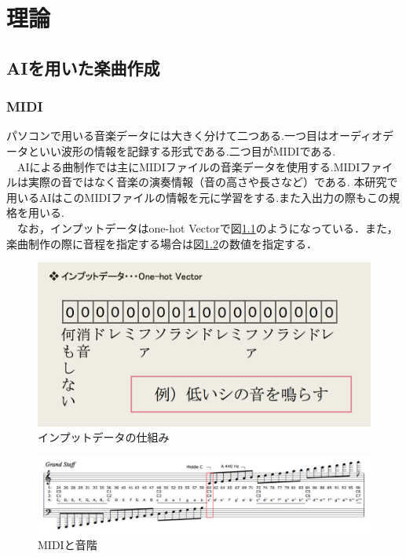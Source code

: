 \chapter{理論}
\section{AIを用いた楽曲作成}
\subsection{MIDI}
パソコンで用いる音楽データには大きく分けて二つある.一つ目はオーディオデータといい波形の情報を記録する形式である.二つ目がMIDIである.\\
　AIによる曲制作では主にMIDIファイルの音楽データを使用する.MIDIファイルは実際の音ではなく音楽の演奏情報（音の高さや長さなど）である.
本研究で用いるAIはこのMIDIファイルの情報を元に学習をする.また入出力の際もこの規格を用いる.\\
　なお，インプットデータはone-hot Vectorで図\ref{fig:インプットデータの仕組み}のようになっている．また，楽曲制作の際に音程を指定する場合は図\ref{fig:MIDIと音階}の数値を指定する．
\begin{figure}[h]
    \begin{screen}
    \begin{center}
        \includegraphics[scale=0.8,clip]{./img/midi1.png}
        \caption{インプットデータの仕組み}
        \label{fig:インプットデータの仕組み}
    \end{center}
    \end{screen}
\end{figure}
\newpage
\begin{figure}[h]
    \begin{screen}
    \begin{center}
        \includegraphics[scale=0.4,clip]{./img/midi2.png}
        \caption{MIDIと音階}
        \label{fig:MIDIと音階}
    \end{center}
    \end{screen}
\end{figure}

